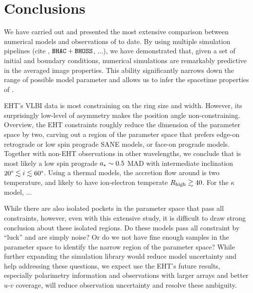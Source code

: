 \section{Conclusions}\label{sec:conclusions}


We have carried out and presented the most extensive comparison
between numerical models and observations of \sgra to date.
By using multiple simulation pipelines (cite \patoka, $\texttt{BHAC}+\texttt{BHOSS}$, ...),
we have demonstrated that, given a set of initial and boundary
conditions, numerical simulations are remarkably predictive in the
averaged image properties.
This ability significantly narrows down the range of possible model
parameter and allows us to infer the spacetime properties of \sgra
{}.

EHT's VLBI data is most constraining on the ring size and width.
However, its surprisingly low-level of asymmetry makes the position
angle non-constraining.
Overview, the EHT constraints roughly reduce the dimension of the
parameter space by two, carving out a region of the parameter space
that prefers edge-on retrograde or low spin prograde SANE models, or
face-on prograde models.
Together with non-EHT observations in other wavelengths, we conclude
that \sgra is most likely a low spin prograde $a_* \sim 0.5$ MAD with
intermediate inclination $20\degree \lesssim i \lesssim 60\degree$.
Using a thermal models, the accretion flow around \sgra is two
temperature, and likely to have ion-electron temperate $R_\mathrm{high} \gtrsim
40$.
For the $\kappa$ model, ...

While there are also isolated pockets in the parameter space that pass
all constraints, however, even with this extensive study, it is
difficult to draw strong conclusion about these isolated regions.
Do these models pass all constraint by ``luck'' and are simply noise?
Or do we not have fine enough samples in the parameter space to
identify the narrow region of the parameter space?
While further expanding the simulation library would reduce model
uncertainty and help addressing these questions, we expect use the
EHT's future results, especially polarimetry information and
observations with larger arrays and better $u$-$v$ coverage, will
reduce observation uncertainty and resolve these ambiguity.

